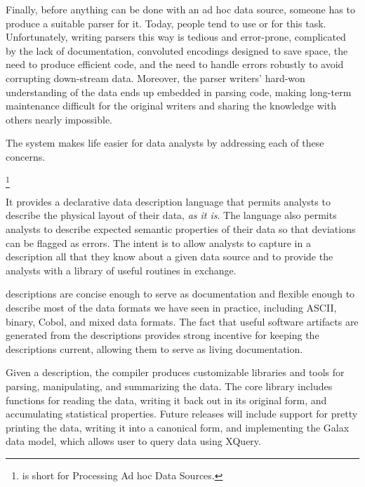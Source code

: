 Finally, before anything can be done with an ad hoc data source,
someone has to produce a suitable parser for it.
Today, people tend to use \C{} or \perl{} for this task.
Unfortunately, writing
parsers this way is tedious and error-prone, complicated by the lack
of documentation, convoluted encodings designed to save space, 
the need to produce efficient code,
and the need to handle errors robustly to avoid corrupting down-stream data.
Moreover, the parser writers' hard-won understanding of the data
ends up embedded in parsing code, making long-term maintenance
difficult for the original writers and sharing the knowledge with
others nearly impossible.

The \pads{} system makes life easier for data analysts by addressing
each of these concerns.\begin{latexonly}\footnote{
  \pads{} is short for Processing Ad hoc Data Sources.
}\end{latexonly}
It provides a declarative data description
language that permits analysts to describe the physical layout of
their data, \textit{as it is}.  The language also permits analysts to
describe expected semantic properties of their data so that deviations can
be flagged as errors. The intent is to allow analysts to capture in a
\pads{} description all that they know about a given data source
and to provide the analysts with a library of useful routines in exchange. 


\pads{} descriptions are concise enough to
serve as documentation and flexible enough to describe most of
the data formats we have seen in practice, including ASCII, binary,
Cobol, and mixed data formats.  The fact that useful software
artifacts are generated from the descriptions provides strong
incentive for keeping the descriptions current, allowing them to serve
as living documentation.  

Given a \pads{} description, the \pads{} compiler produces
customizable \C{} libraries and tools for parsing, manipulating, and
summarizing the data. 
The core \C{} library includes functions for
reading the data, writing it back out in its original form, 
and accumulating statistical
properties.  
Future releases will include support for pretty printing the data,
writing it into a canonical \xml{} form, and implementing 
the Galax data model, which allows user to query \pads{} data using XQuery.

